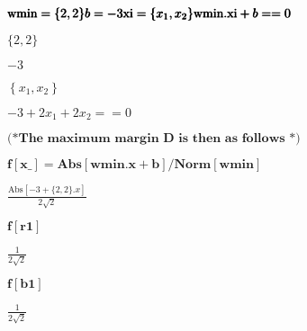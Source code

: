 \documentclass{article}
\begin{document}
\begin{doublespace}
\noindent\(\pmb{\text{wmin} = \{2,2\}}\\
\pmb{b=-3}\\
\pmb{\text{xi}=\left\{x_1,x_2\right\}}\\
\pmb{\text{wmin}.\text{xi} + b ==0}\)
\end{doublespace}

\begin{doublespace}
\noindent\(\{2,2\}\)
\end{doublespace}

\begin{doublespace}
\noindent\(-3\)
\end{doublespace}

\begin{doublespace}
\noindent\(\left\{x_1,x_2\right\}\)
\end{doublespace}

\begin{doublespace}
\noindent\(-3+2 x_1+2 x_2==0\)
\end{doublespace}

\begin{doublespace}
\noindent\(\pmb{\text{(*The maximum margin D is then as follows *)}}\)
\end{doublespace}

\begin{doublespace}
\noindent\(\pmb{f[\text{x$\_$}]=\text{Abs}[\text{wmin}.x+b]/\text{Norm}[\text{wmin}]}\)
\end{doublespace}

\begin{doublespace}
\noindent\(\frac{\text{Abs}[-3+\{2,2\}.x]}{2 \sqrt{2}}\)
\end{doublespace}

\begin{doublespace}
\noindent\(\pmb{f[\text{r1}]}\)
\end{doublespace}

\begin{doublespace}
\noindent\(\frac{1}{2 \sqrt{2}}\)
\end{doublespace}

\begin{doublespace}
\noindent\(\pmb{f[\text{b1}]}\)
\end{doublespace}

\begin{doublespace}
\noindent\(\frac{1}{2 \sqrt{2}}\)
\end{doublespace}
\end{document}

